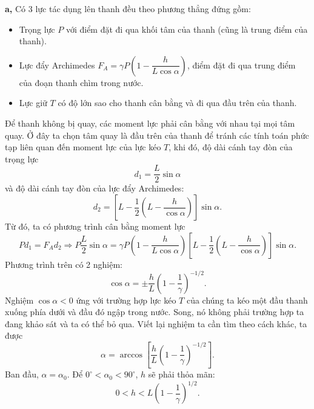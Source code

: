 \textbf{a,} Có 3 lực tác dụng lên thanh đều theo phương thẳng đứng gồm:
\begin{itemize}
    \item Trọng lực $P$ với điểm đặt đi qua khối tâm của thanh (cũng là trung điểm của thanh).
    \item Lực đẩy Archimedes $F_A = \gamma P \left( 1 - \dfrac{h}{L \cos \alpha} \right) $, điểm đặt đi qua trung điểm của đoạn thanh chìm trong nước. 
    \item Lực giữ $T$ có độ lớn sao cho thanh cân bằng và đi qua đầu trên của thanh.
\end{itemize}

Để thanh không bị quay, các moment lực phải cân bằng với nhau tại mọi tâm quay. Ở đây ta chọn tâm quay là đầu trên của thanh để tránh các tính toán phức tạp liên quan đến moment lực của lực kéo $T$, khi đó, độ dài cánh tay đòn của trọng lực
\begin{equation}
    d_1 = \dfrac{L}{2} \sin \alpha \nonumber
\end{equation}
và độ dài cánh tay đòn của lực đẩy Archimedes:
\begin{equation}
    d_2 = \left[ L - \dfrac{1}{2} \left( L - \dfrac{h}{\cos \alpha} \right) \right] \sin \alpha. \nonumber
\end{equation}
Từ đó, ta có phương trình cân bằng moment lực
\begin{equation}
    P d_1 = F_A d_2 \Rightarrow P \dfrac{L}{2} \sin \alpha = \gamma P \left( 1 - \dfrac{h}{L \cos \alpha} \right) \left[ L - \dfrac{1}{2} \left( L - \dfrac{h}{\cos \alpha} \right) \right] \sin \alpha. \nonumber
\end{equation}
Phương trình trên có 2 nghiệm:
\begin{equation}
    \cos \alpha = \pm \dfrac{h}{L} \left( 1 - \dfrac{1}{\gamma} \right)^{-1/2}. \nonumber
\end{equation}
Nghiệm $\cos \alpha < 0$ ứng với trường hợp lực kéo $T$ của chúng ta kéo một đầu thanh xuống phía dưới và đầu đó ngập trong nước. Song, nó không phải trường hợp ta đang khảo sát và ta có thể bỏ qua. Viết lại nghiệm ta cần tìm theo cách khác, ta được
\begin{equation}
    \alpha = \arccos{ \left[ \dfrac{h}{L} \left( 1 - \dfrac{1}{\gamma} \right)^{-1/2} \right] }. \nonumber
\end{equation}
Ban đầu, $\alpha=\alpha_0$. Để $0^\circ < \alpha_0 < 90^\circ$, $h$ sẽ phải thỏa mãn:
\begin{equation}
    0 < h < L \left( 1 - \dfrac{1}{\gamma} \right)^{1/2}. \nonumber
\end{equation}

